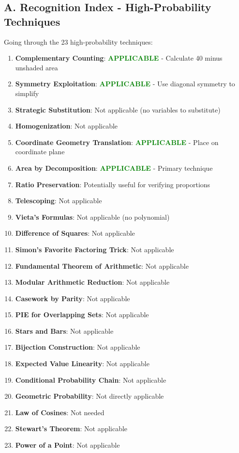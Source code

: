 \documentclass[11pt]{article}
\begin{document}
\begin{conversionbox}
\subsection*{A. Recognition Index - High-Probability Techniques}

Going through the 23 high-probability techniques:

\begin{enumerate}
    \item \textbf{Complementary Counting}: \textcolor{green}{\textbf{APPLICABLE}} - Calculate 40 minus unshaded area
    \item \textbf{Symmetry Exploitation}: \textcolor{green}{\textbf{APPLICABLE}} - Use diagonal symmetry to simplify
    \item \textbf{Strategic Substitution}: Not applicable (no variables to substitute)
    \item \textbf{Homogenization}: Not applicable
    \item \textbf{Coordinate Geometry Translation}: \textcolor{green}{\textbf{APPLICABLE}} - Place on coordinate plane
    \item \textbf{Area by Decomposition}: \textcolor{green}{\textbf{APPLICABLE}} - Primary technique
    \item \textbf{Ratio Preservation}: Potentially useful for verifying proportions
    \item \textbf{Telescoping}: Not applicable
    \item \textbf{Vieta's Formulas}: Not applicable (no polynomial)
    \item \textbf{Difference of Squares}: Not applicable
    \item \textbf{Simon's Favorite Factoring Trick}: Not applicable
    \item \textbf{Fundamental Theorem of Arithmetic}: Not applicable
    \item \textbf{Modular Arithmetic Reduction}: Not applicable
    \item \textbf{Casework by Parity}: Not applicable
    \item \textbf{PIE for Overlapping Sets}: Not applicable
    \item \textbf{Stars and Bars}: Not applicable
    \item \textbf{Bijection Construction}: Not applicable
    \item \textbf{Expected Value Linearity}: Not applicable
    \item \textbf{Conditional Probability Chain}: Not applicable
    \item \textbf{Geometric Probability}: Not directly applicable
    \item \textbf{Law of Cosines}: Not needed
    \item \textbf{Stewart's Theorem}: Not applicable
    \item \textbf{Power of a Point}: Not applicable
\end{enumerate}


\end{conversionbox}
\end{document}
